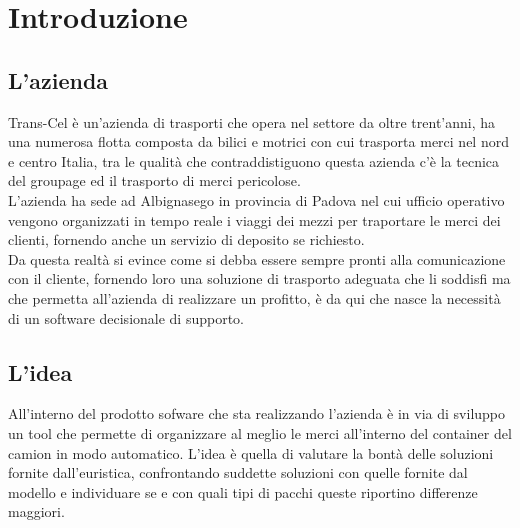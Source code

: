 
\chapter{Introduzione}
\section{L'azienda}
Trans-Cel è un'azienda di trasporti che opera nel settore da oltre trent'anni, ha una numerosa flotta composta da bilici e motrici con cui trasporta merci nel nord e centro Italia, tra le qualità che contraddistiguono questa azienda c'è la tecnica del groupage ed il trasporto di merci pericolose.\\
L'azienda ha sede ad Albignasego in provincia di Padova nel cui ufficio operativo vengono organizzati in tempo reale i viaggi dei mezzi per traportare le merci dei clienti, fornendo anche un servizio di deposito se richiesto.\\
Da questa realtà si evince come si debba essere sempre pronti alla comunicazione con il cliente, fornendo loro una soluzione di trasporto adeguata che li soddisfi ma che permetta all'azienda di realizzare un profitto, è da qui che nasce la necessità di un software decisionale di supporto.
\newpage
\section{L'idea}
All'interno del prodotto sofware che sta realizzando l'azienda è in via di sviluppo un tool che permette di organizzare al meglio le merci all'interno del container del camion in modo automatico. L'idea è quella di valutare la bontà delle soluzioni fornite dall'euristica, confrontando suddette soluzioni con quelle fornite dal modello e individuare se e con quali tipi di pacchi queste riportino differenze maggiori.

